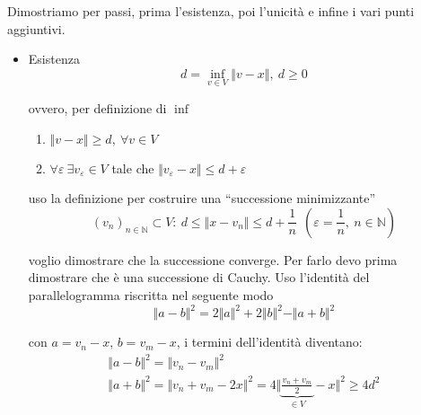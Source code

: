 \begin{dimostrazione}
    Dimostriamo per passi, prima l'esistenza, poi l'unicità e infine i vari punti aggiuntivi.
    \begin{itemize}
        \item Esistenza
              \begin{equation*}
                  d=\inf_{v\in V}\Vert v-x\Vert,\ d\geq 0
              \end{equation*}

              ovvero, per definizione di $\inf$
              \begin{enumerate}
                  \item $\displaystyle \Vert v-x\Vert \geq d,\ \forall v\in V$
                  \item $\displaystyle \forall \varepsilon \ \exists v_{\varepsilon } \in V$ tale che $\displaystyle \Vert v_{\varepsilon } -x\Vert \leq d+\varepsilon $ \ $ $
              \end{enumerate}

              uso la definizione per costruire una ``successione minimizzante''
              \begin{equation}
                  (v_{n})_{n\in \mathbb{N}} \subset V:\ d\leq \Vert x-v_{n}\Vert \leq d+\frac{1}{n} \ \ \left(\varepsilon =\frac{1}{n},\ n\in \mathbb{N}\right)
                  \label{eq:teo-proiez-suc-min}
              \end{equation}

              voglio dimostrare che la successione converge. Per farlo devo prima dimostrare che è una successione di Cauchy. Uso l'identità del parallelogramma riscritta nel seguente modo
              \begin{equation*}
                  \Vert a-b\Vert ^{2} =2\Vert a\Vert ^{2} +2\Vert b\Vert ^{2} -\Vert a+b\Vert ^{2}
              \end{equation*}

              con $\displaystyle a=v_{n} -x$, $\displaystyle b=v_{m} -x$, i termini dell'identità diventano:
              \begin{equation*}
                  \begin{array}{ l }
                      \Vert a-b\Vert ^{2} =\Vert v_{n} -v_{m}\Vert ^{2} \\
                      \Vert a+b\Vert ^{2} =\Vert v_{n} +v_{m} -2x\Vert ^{2} =4\bigg\Vert \underbrace{\frac{v_{n} +v_{m}}{2}}_{\in V} -x\bigg\Vert ^{2} \geq 4d^{2}
                  \end{array}
              \end{equation*}


\end{itemize}
\end{dimostrazione}
